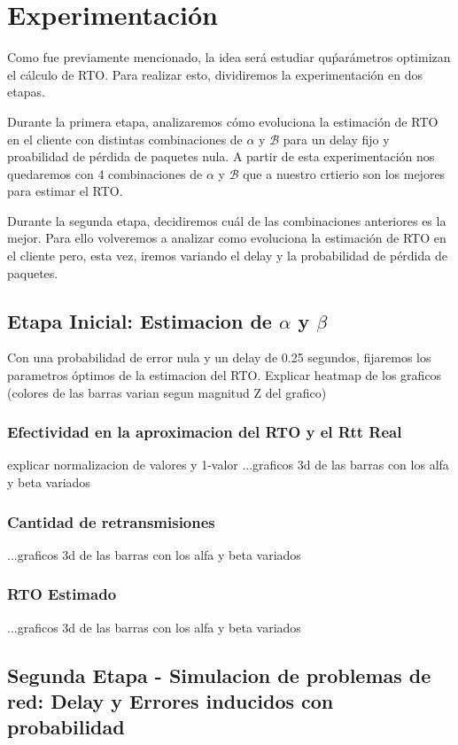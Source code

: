 \section{Experimentaci\'on}

Como fue previamente mencionado, la idea ser\'a estudiar qu\' par\'ametros optimizan el c\'alculo de RTO. Para realizar esto, dividiremos la experimentaci\'on en dos etapas.

Durante la primera etapa, analizaremos c\'omo evoluciona la estimaci\'on de RTO en el cliente con distintas combinaciones de $\alpha$ y $\mathcal{B}$ para un delay fijo y proabilidad de p\'erdida de paquetes nula. A partir de esta experimentaci\'on nos quedaremos con 4 combinaciones de $\alpha$ y $\mathcal{B}$ que a nuestro crtierio son los mejores para estimar el RTO.

Durante la segunda etapa, decidiremos cu\'al de las combinaciones anteriores es la mejor. Para ello volveremos a analizar como evoluciona la estimaci\'on de RTO en el cliente pero, esta vez, iremos variando el delay y la probabilidad de p\'erdida de paquetes. 

\subsection{Etapa Inicial: Estimacion de $\alpha$ y $\beta$}
Con una probabilidad de error nula y un delay de 0.25 segundos, fijaremos los parametros \'optimos de la estimacion del RTO.
Explicar heatmap de los graficos (colores de las barras varian segun magnitud Z del grafico)

\subsubsection{Efectividad en la aproximacion del RTO y el Rtt Real}
	explicar normalizacion de valores y 1-valor
	...graficos 3d de las barras con los alfa y beta variados

\subsubsection{Cantidad de retransmisiones}
	...graficos 3d de las barras con los alfa y beta variados

\subsubsection{RTO Estimado}
	...graficos 3d de las barras con los alfa y beta variados

\subsection{Segunda Etapa - Simulacion de problemas de red: Delay y Errores inducidos con probabilidad}